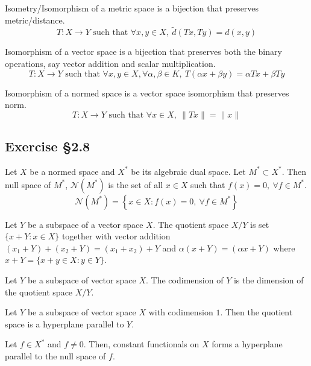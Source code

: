 \begin{definition}[isomorphism]
	Isometry/Isomorphism of a metric space is a bijection that preserves metric/distance.
	\[ T : X \to Y \text{ such that } \forall x,y \in X,\ \tilde{d}(Tx,Ty) = d(x,y) \]

	Isomorphism of a vector space is a bijection that preserves both the binary operations, say vector addition and scalar multiplication.
	\[ T : X \to Y \text{ such that } \forall x,y \in X, \forall \alpha,\beta \in K,\ T(\alpha x + \beta y) = \alpha Tx + \beta Ty \]

	Isomorphism of a normed space is a vector space isomorphism that preserves norm.
	\[ T : X \to Y \text{ such that } \forall x \in X,\ \| Tx \| = \| x \| \]
\end{definition}

\subsection*{Exercise \S2.8}
\begin{definition}
	Let $X$ be a normed space and $X^\ast$ be its algebraic dual space.
	Let $M^\ast \subset X^\ast$.
	Then null space of $M^\ast$, $\mathcal{N}(M^\ast)$ is the set of all $x \in X$ such that $f(x) = 0,\ \forall f \in M^\ast$.
	\[ \mathcal{N}(M^\ast) = \left\{ x \in X : f(x) = 0,\ \forall f \in M^\ast \right\} \]
\end{definition}

\begin{definition}
	Let $Y$ be a subspace of a vector space $X$.
	The quotient space $X/Y$ is set $\{ x+Y : x \in X \}$ together with vector addition $(x_1+Y)+(x_2+Y) = (x_1+x_2)+Y$ and $\alpha(x+Y) = (\alpha x + Y)$ where $x+Y = \{ x+y \in X : y \in Y \}$.
\end{definition}
\begin{definition}[codimension]
	Let $Y$ be a subspace of vector space $X$.
	The codimension of $Y$ is the dimension of the quotient space $X/Y$.
\end{definition}

\begin{definition}[hyperplane]
	Let $Y$ be a subspace of vector space $X$ with codimension $1$.
	Then the quotient space is a hyperplane parallel to $Y$.
\end{definition}

\begin{remark}
	Let $f \in X^\ast$ and $f \ne 0$.
	Then, constant functionals on $X$ forms a hyperplane parallel to the null space of $f$.
\end{remark}

